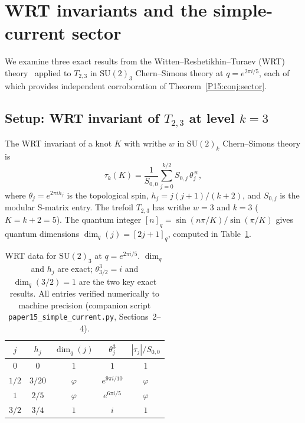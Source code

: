 \documentclass[11pt,a4paper]{article}
\theoremstyle{definition}\newtheorem{definition}[theorem]{Definition}
\theoremstyle{remark}
\newcommand{\vp}{\varphi}
\begin{document}
\section{WRT invariants and the simple-current sector}
\label{P15:sec:wrt}

We examine three exact results from the
Witten--Reshetikhin--Turaev (WRT) theory~\cite{Witten1989}
applied to $T_{2,3}$ in $\mathrm{SU}(2)_3$ Chern--Simons theory at
$q=e^{2\pi i/5}$, each of which provides independent corroboration
of Theorem~\ref{P15:conj:sector}.

\subsection{Setup: WRT invariant of $T_{2,3}$ at level $k=3$}
\label{P15:sec:wrt_setup}

The WRT invariant of a knot $K$ with writhe $w$ in $\mathrm{SU}(2)_k$
Chern--Simons theory is
\begin{equation}
  \tau_k(K) = \frac{1}{S_{0,0}}\sum_{j=0}^{k/2}
    S_{0,j}\,\theta_j^{\,w},
  \label{P15:eq:wrt}
\end{equation}
where $\theta_j = e^{2\pi i h_j}$ is the topological spin,
$h_j = j(j+1)/(k+2)$, and $S_{0,j}$ is the modular S-matrix entry.
The trefoil $T_{2,3}$ has writhe $w=3$ and $k=3$ ($K=k+2=5$).
The quantum integer $[n]_q = \sin(n\pi/K)/\sin(\pi/K)$
gives quantum dimensions
$\dim_q(j) = [2j+1]_q$,
computed in Table~\ref{P15:tab:wrt_data}.

\begin{table}[h!]
\centering
\renewcommand{\arraystretch}{1.35}
\begin{tabular}{ccccc}
\toprule
$j$ & $h_j$ & $\dim_q(j)$ & $\theta_j^3$ & $|\tau_j|/S_{0,0}$ \\
\midrule
$0$   & $0$        & $1$    & $1$  & $1$ \\
$1/2$ & $3/20$     & $\vp$  & $e^{9\pi i/10}$ & $\vp$ \\
$1$   & $2/5$      & $\vp$  & $e^{6\pi i/5}$  & $\vp$ \\
$3/2$ & $3/4$      & $1$    & $i$  & $1$ \\
\bottomrule
\end{tabular}
\caption{WRT data for $\mathrm{SU}(2)_3$ at $q=e^{2\pi i/5}$.
$\dim_q$ and $h_j$ are exact;
$\theta_{3/2}^3 = i$ and $\dim_q(3/2)=1$ are the two key exact results.
All entries verified numerically to machine precision
(companion script \texttt{paper15\_simple\_current.py}, Sections~2--4).}
\label{P15:tab:wrt_data}
\end{table}
\end{document}

